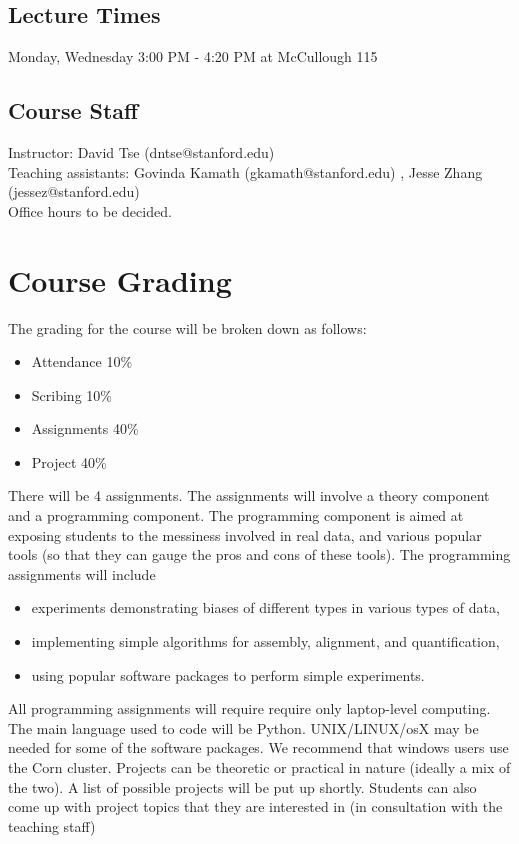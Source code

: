\documentclass[11pt,onecolumn]{article}
\begin{document}
\subsection*{Lecture Times}
Monday, Wednesday 3:00 PM - 4:20 PM at McCullough 115

\subsection*{Course Staff}
Instructor: David Tse (dntse@stanford.edu) \\
Teaching assistants: Govinda Kamath (gkamath@stanford.edu) , Jesse Zhang (jessez@stanford.edu) \\
Office hours to be decided.
\pagebreak

\section*{Course Grading}
The grading for the course will be broken down as follows:
\begin{itemize}
	\itemsep0em 
	\item Attendance 10\%
	\item Scribing 10\%
	\item Assignments 40\%
	\item Project 40\%
\end{itemize}
There will be 4 assignments. The assignments will involve a theory component and a programming component. The programming component is aimed at exposing students to the messiness involved in real data, and various popular tools (so that they can gauge the pros and cons of these tools). The programming assignments will include
\begin{itemize}
	\itemsep0em
	\item experiments demonstrating biases of different types in various types of data,
	\item implementing simple algorithms for assembly, alignment, and quantification,
	\item using popular software packages to perform simple experiments. 
\end{itemize}
All programming assignments will require require only laptop-level computing. The main language used to code will be Python. UNIX/LINUX/osX may be needed for some of the software packages. We recommend that windows users use the Corn cluster. Projects can be theoretic or practical in nature (ideally a mix of the two). A list of possible projects will be put up shortly. Students can also come up with project topics that they are interested in (in consultation with the teaching staff) \\
\end{document}
